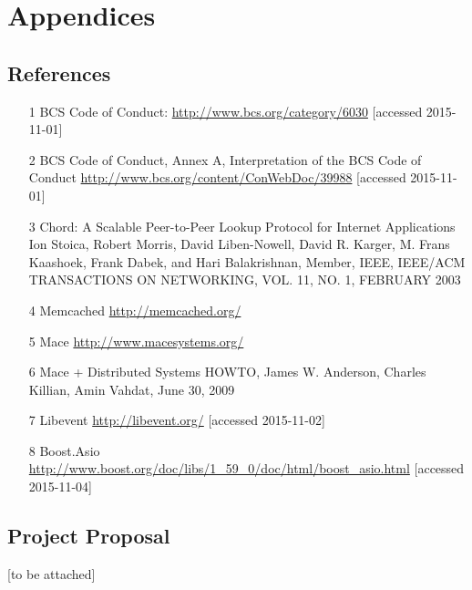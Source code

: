 \documentclass{article}
\begin{document}
\section{Appendices}
\subsection{References}
\begin{itemize}
\item[1] BCS Code of Conduct: \url{http://www.bcs.org/category/6030}  [accessed 2015-11-01]

\item[2] BCS Code of Conduct, Annex A, Interpretation of the BCS Code of Conduct \url{http://www.bcs.org/content/ConWebDoc/39988}  [accessed 2015-11-01]

\item[3] Chord: A Scalable Peer-to-Peer Lookup Protocol for Internet Applications Ion Stoica, Robert Morris, David Liben-Nowell, David R. Karger, M. Frans Kaashoek, Frank Dabek, and Hari Balakrishnan, Member, IEEE, IEEE/ACM TRANSACTIONS ON NETWORKING, VOL. 11, NO. 1, FEBRUARY 2003

\item[4] Memcached \url{http://memcached.org/}

\item[5] Mace \url{http://www.macesystems.org/}

\item[6] Mace + Distributed Systems HOWTO, James W. Anderson, Charles Killian, Amin Vahdat, June 30, 2009

\item[7] Libevent \url{http://libevent.org/} [accessed 2015-11-02]

\item[8] Boost.Asio \url{http://www.boost.org/doc/libs/1_59_0/doc/html/boost_asio.html} [accessed 2015-11-04]


\end{itemize}
\subsection{Project Proposal}
[to be attached]
\end{document}
